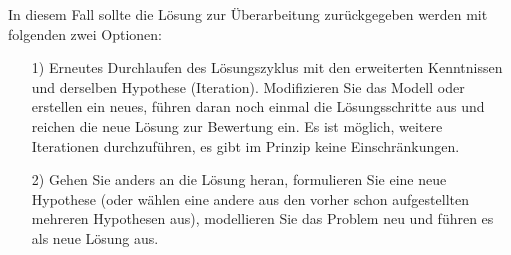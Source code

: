 \documentclass[11pt,a4paper]{article}
\begin{document}
In diesem Fall sollte die Lösung zur Überarbeitung zurückgegeben werden mit
folgenden zwei Optionen:
\begin{itemize}
\item [1)] Erneutes Durchlaufen des Lösungszyklus mit den erweiterten
  Kenntnissen und derselben Hypothese (Iteration).  Modifizieren Sie das
  Modell oder erstellen ein neues, führen daran noch einmal die
  Lösungsschritte aus und reichen die neue Lösung zur Bewertung ein. Es ist
  möglich, weitere Iterationen durchzuführen, es gibt im Prinzip keine
  Einschränkungen.
\enlargethispage{-1em}
\item [2)] Gehen Sie anders an die Lösung heran, formulieren Sie eine neue
  Hypothese (oder wählen eine andere aus den vorher schon aufgestellten
  mehreren Hypothesen aus), modellieren Sie das Problem neu und führen es als
  neue Lösung aus.
\end{itemize}
\end{document}
